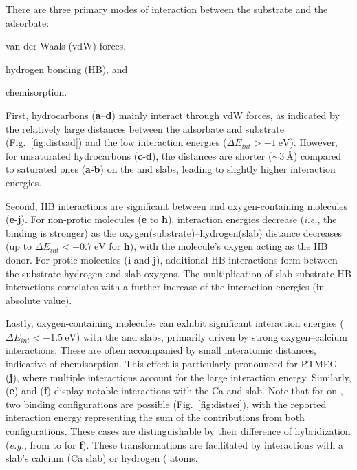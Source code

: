 \documentclass[journal=jpccck,manuscript=article]{achemso}
\begin{document}
\clearpage

There are three primary modes of interaction between the substrate and the adsorbate: \begin{inparaenum}[i)] \item van der Waals (vdW) forces, 
\item hydrogen bonding (HB), and 
\item chemisorption. 
\end{inparaenum}
First, hydrocarbons (\textbf{a}–\textbf{d}) mainly interact through vdW forces, as indicated by the relatively large distances between the adsorbate and substrate (Fig.~\ref{fig:distsad}) and the low interaction energies ($\Delta E_{int} > \SI{-1}{\electronvolt}$). However, for unsaturated hydrocarbons (\textbf{c}-\textbf{d}), the distances are shorter ($\sim\SI{3}{\angstrom}$) compared to saturated ones (\textbf{a}-\textbf{b}) on the  and  slabs, leading to slightly higher interaction energies.

Second, HB interactions are significant between  and oxygen-containing mole\-cules (\textbf{e}-\textbf{j}). For non-protic molecules (\textbf{e} to \textbf{h}), interaction energies decrease (\textit{i.e.}, the binding is stronger) as the oxygen(substrate)--hydrogen(slab) distance decreases (up to $\Delta E_{int}<-\SI{0.7}{\electronvolt}$ for \textbf{h}), with the molecule's oxygen acting as the HB donor. For protic molecules (\textbf{i} and \textbf{j}), additional HB interactions form between the substrate hydrogen and slab oxygens. The multiplication of slab-substrate HB interactions correlates with a further increase of the interaction energies (in absolute value).


Lastly, oxygen-containing molecules can exhibit significant interaction energies ($\Delta E_{int} < \SI{-1.5}{\electronvolt}$) with the  and  slabs, primarily driven by strong oxygen--calcium interactions. These are often accompanied by small interatomic distances, indicative of chemisorption. This effect is particularly pronounced for PTMEG (\textbf{j}), where multiple interactions account for the large interaction energy. Similarly,  (\textbf{e}) and  (\textbf{f}) display notable interactions with the Ca and  slab. Note that for  on , two binding configurations are possible (Fig.~\ref{fig:distsei}), with the reported interaction energy representing the sum of the contributions from both configurations. These cases are distinguishable by their difference of hybridization (\textit{e.g.}, from  to  for \textbf{f}). These transformations are facilitated by interactions with a slab’s calcium (Ca slab) or hydrogen ( atoms.
\end{document}
